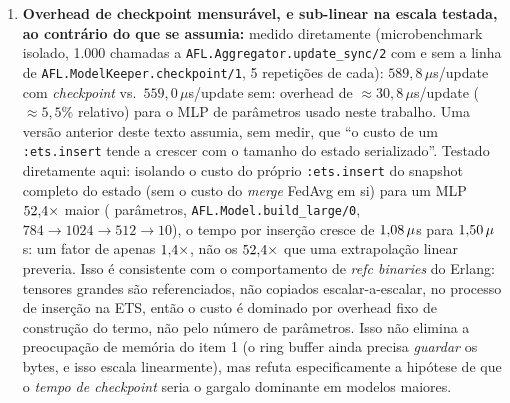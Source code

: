 \documentclass[conference,a4paper]{IEEEtran}
\begin{document}
\begin{enumerate}[noitemsep,leftmargin=*]
    \texttt{AFL.ModelKeeper} possuem suas tabelas permanentemente) mais
    checkpoint em disco para o \texttt{AFL.ModelKeeper} --- fecha o gap
    por completo para o modelo global (\statExpRFiveModelOwnerDeadPct{}\%
    de perda ao matar o dono, medido). Para o buffer de gradientes, sem
    persistência em disco, a perda ao matar o dono permanece em
    \statExpRFiveBufferOwnerDeadPct{}\% --- um resíduo aceito, não uma
    corrida silenciosa: redundância no nível de processo não se fecha por
    composição (proteger um processo com outro só desloca a
    vulnerabilidade), e fechar esse resíduo por completo exigiria a mesma
    escalada para disco já aplicada ao modelo (trabalho futuro,
    Seção~\ref{sec:conclusion}).
  \item \textbf{Overhead de checkpoint mensurável, e sub-linear na escala
    testada, ao contrário do que se assumia:} medido diretamente
    (microbenchmark isolado, 1.000 chamadas a
    \texttt{AFL.Aggregator.update\_sync/2} com e sem a linha de
    \texttt{AFL.ModelKeeper.checkpoint/1}, 5 repetições de cada):
    $589{,}8\,\mu$s/update com \textit{checkpoint} vs.\ $559{,}0\,\mu$s/update
    sem: overhead de $\approx30{,}8\,\mu$s/update ($\approx5{,}5\%$
    relativo) para o MLP de \statScaleSmallParams{} parâmetros usado neste
    trabalho. Uma versão anterior deste texto assumia, sem medir, que ``o
    custo de um \texttt{:ets.insert} tende a crescer com o tamanho do
    estado serializado''. Testado diretamente aqui: isolando o custo do
    próprio \texttt{:ets.insert} do snapshot completo do estado (sem o
    custo do \textit{merge} FedAvg em si) para um MLP
    $52{,}4\times$ maior (\statScaleLargeParams{} parâmetros,
    \texttt{AFL.Model.build\_large/0}, $784\!\to\!1024\!\to\!512\!\to\!10$),
    o tempo por inserção cresce de $1{,}08\,\mu$s para
    $1{,}50\,\mu$s: um fator de apenas
    $1{,}4\times$, não os $52{,}4\times$ que uma extrapolação
    linear preveria. Isso é consistente com o comportamento de
    \textit{refc binaries} do Erlang: tensores grandes são referenciados,
    não copiados escalar-a-escalar, no processo de inserção na ETS, então o
    custo é dominado por overhead fixo de construção do termo, não pelo
    número de parâmetros. Isso não elimina a preocupação de memória do
    item 1 (o ring buffer ainda precisa \emph{guardar} os bytes, e isso
    escala linearmente), mas refuta especificamente a hipótese de que o
    \emph{tempo de checkpoint} seria o gargalo dominante em modelos maiores.
\end{enumerate}
\end{document}

